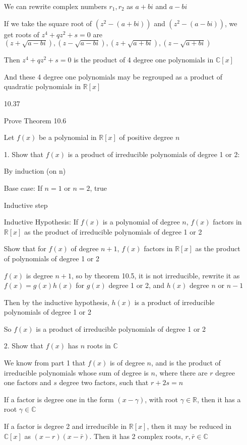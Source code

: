 \documentclass[12pt]{article}
\begin{document}
\begin{itemize}
	We can rewrite complex numbers $r_1, r_2$ as $a + bi$ and $a - bi$

	If we take the square root of $(z^2 - (a+ bi))$ and $(z^2 -(a-bi))$, we get roots of $z^4 + qz^2 + s = 0$ are $(z + \sqrt{a - bi}), (z - \sqrt{a - bi}), (z + \sqrt{a + bi}), (z - \sqrt{a + bi})$

	Then $z^4 + qz^2 + s =0$ is the product of 4 degree one polynomials in $\mathbb{C}[x]$

	And these 4 degree one polynomials may be regrouped as a product of quadratic polynomials in $\mathbb{R}[x]$	


\newpage

\item[10.37]

	Prove Theorem 10.6

	Let $f(x)$ be a polynomial in $\mathbb{R}[x]$ of positive degree $n$

	1. Show that $f(x)$ is a product of irreducible polynomials of degree 1 or 2:

	By induction (on n)

	Base case: If $n = 1$ or $n = 2$, true

	Inductive step

	Inductive Hypothesis: If $f(x)$ is a polynomial of degree $n$, $f(x)$ factors in $\mathbb{R}[x]$ as the product of irreducible polynomials of degree 1 or 2

	Show that for $f(x)$ of degree $n+1$, $f(x)$ factors in $\mathbb{R}[x]$ as the product of polynomials of degree 1 or 2

	$f(x)$ is degree $n+1$, so by theorem 10.5, it is not irreducible, rewrite it as $f(x) = g(x)h(x)$ for $g(x)$ degree 1 or 2, and $h(x)$ degree $n$ or $n - 1$

	Then by the inductive hypothesis, $h(x)$ is a product of irreducible polynomials of degree 1 or 2

	So $f(x)$ is a product of irreducible polynomials of degree 1 or 2
		
	2. Show that $f(x)$ has $n$ roots in $\mathbb{C}$

	We know from part 1 that $f(x)$ is of degree $n$, and is the product of irreducible polynomials whose sum of degree is $n$, where there are $r$ degree one factors and $s$ degree two factors, such that $r + 2s = n$

	If a factor is degree one in the form $(x-\gamma)$, with root $\gamma \in \mathbb{R}$, then it has a root $\gamma \in \mathbb{C}$

	If a factor is degree 2 and irreducible in $\mathbb{R}[x]$, then it may be reduced in $\mathbb{C}[x]$ as $(x -r)(x - \bar{r})$. Then it has 2 complex roots, $r, \bar{r} \in \mathbb{C}$


\end{itemize}
\end{document}
